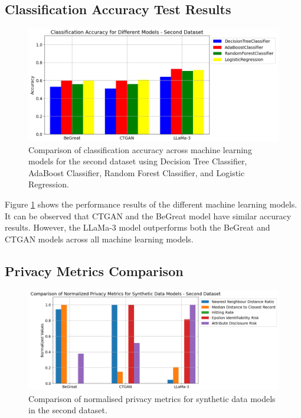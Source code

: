 \subsection{Classification Accuracy Test Results}




\begin{figure}[H]
    \centering
        \centering
        \includegraphics[width=1\textwidth]{images/dataset2_ml.png}
        \caption{Comparison of classification accuracy across machine learning models for the second dataset using Decision Tree Classifier, AdaBoost Classifier, Random Forest Classifier, and Logistic Regression.}
        \label{fig:dataset2_ml}
\end{figure}

Figure \ref{fig:dataset2_ml} shows the performance results of the different machine learning models. It can be observed that CTGAN and the BeGreat model have similar accuracy results. However, the LLaMa-3 model outperforms both the BeGreat and CTGAN models across all machine learning models.





\subsection{Privacy Metrics Comparison}

\begin{figure}[H]
    \centering
        \centering
        \includegraphics[width=1\textwidth]{images/dataset2_privacy.png}
        \caption{Comparison of normalised privacy metrics for synthetic data models in the second dataset.}
        \label{fig:dataset2_privacy}
\end{figure}



